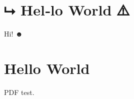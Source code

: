 \documentclass{article}%
\begin{document}
\section{⮡ Hel‑lo World ⚠}

Hi! ☻

\makeatletter%
\section{\unicodepointsUni@tarentPfeil{} Hel\unicodepoints@nbdash{}lo World \unicodepoints@warn{}}
\makeatother%

PDF test.
\end{document}
